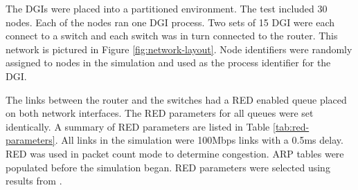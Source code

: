 The \ac{DGI}s were placed into a partitioned environment.
The test included 30 nodes.
Each of the nodes ran one \ac{DGI} process.
Two sets of 15 \ac{DGI} were each connect to a switch and each switch was in turn connected to the router.
This network is pictured in Figure \ref{fig:network-layout}.
Node identifiers were randomly assigned to nodes in the simulation and used as the process identifier for the \ac{DGI}.

The links between the router and the switches had a \ac{RED} enabled queue placed on both network interfaces.
The \ac{RED} parameters for all queues were set identically.
A summary of \ac{RED} parameters are listed in Table \ref{tab:red-parameters}.
All links in the simulation were 100Mbps links with a 0.5ms delay.
RED was used in packet count mode to determine congestion.
ARP tables were populated before the simulation began.
\ac{RED} parameters were selected using results from \cite{JOURNAL}.

%

